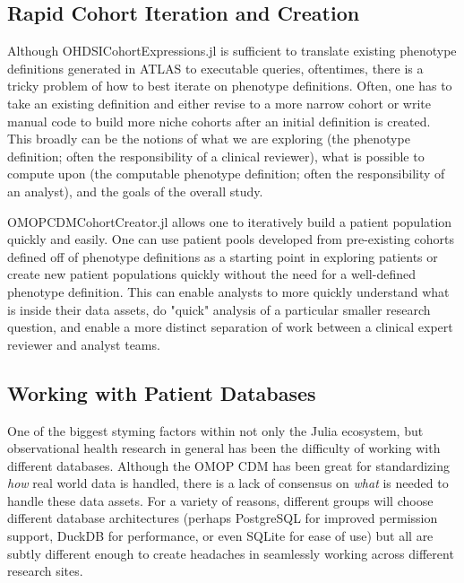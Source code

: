 \documentclass{juliacon}
\begin{document}
\subsection{Rapid Cohort Iteration and Creation}

Although OHDSICohortExpressions.jl is sufficient to translate existing phenotype definitions generated in ATLAS to executable queries, oftentimes, there is a tricky problem of how to best iterate on phenotype definitions. \cite{zelkoDevelopingRobustComputable2023}
Often, one has to take an existing definition and either revise to a more narrow cohort or write manual code to build more niche cohorts after an initial definition is created.
This broadly can be the notions of what we are exploring (the phenotype definition; often the responsibility of a clinical reviewer), what is possible to compute upon (the computable phenotype definition; often the responsibility of an analyst), and the goals of the overall study.

OMOPCDMCohortCreator.jl allows one to iteratively build a patient population quickly and easily.
One can use patient pools developed from pre-existing cohorts defined off of phenotype definitions as a starting point in exploring patients or create new patient populations quickly without the need for a well-defined phenotype definition.
This can enable analysts to more quickly understand what is inside their data assets, do "quick" analysis of a particular smaller research question, and enable a more distinct separation of work between a clinical expert reviewer and analyst teams.

\subsection{Working with Patient Databases}

One of the biggest styming factors within not only the Julia ecosystem, but observational health research in general has been the difficulty of working with different databases.\cite{zelko2023julia}
Although the OMOP CDM has been great for standardizing \textit{how} real world data is handled, there is a lack of consensus on \textit{what} is needed to handle these data assets.
For a variety of reasons, different groups will choose different database architectures (perhaps PostgreSQL for improved permission support, DuckDB for performance, or even SQLite for ease of use) but all are subtly different enough to create headaches in seamlessly working across different research sites.
\end{document}
